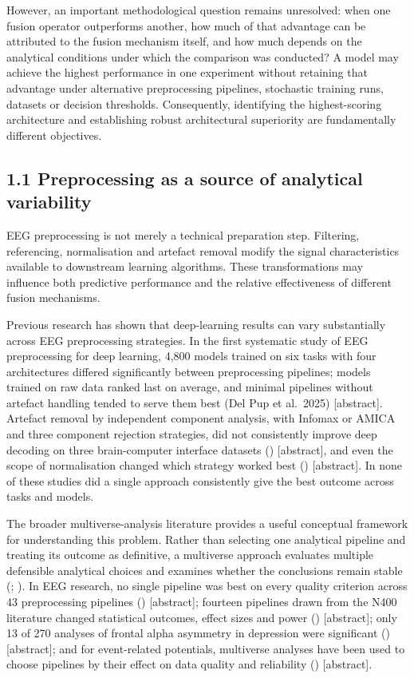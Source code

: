 \documentclass[11pt,a4paper]{article}
\newcounter{none} %
\begin{document}
However, an important methodological question remains unresolved: when one fusion
operator outperforms another, how much of that advantage can be attributed to the fusion
mechanism itself, and how much depends on the analytical conditions under which the
comparison was conducted? A model may achieve the highest performance in one experiment
without retaining that advantage under alternative preprocessing pipelines, stochastic
training runs, datasets or decision thresholds. Consequently, identifying the
highest-scoring architecture and establishing robust architectural superiority are
fundamentally different objectives.

\subsection{1.1 Preprocessing as a source of analytical variability}\label{preprocessing-as-a-source-of-analytical-variability}

EEG preprocessing is not merely a technical preparation step. Filtering, referencing,
normalisation and artefact removal modify the signal characteristics available to
downstream learning algorithms. These transformations may influence both predictive
performance and the relative effectiveness of different fusion mechanisms.

Previous research has shown that deep-learning results can vary substantially across
EEG preprocessing strategies. In the first systematic study of EEG preprocessing for deep
learning, 4,800 models trained on six tasks with four architectures differed
significantly between preprocessing pipelines; models trained on raw data ranked last on
average, and minimal pipelines without artefact handling tended to serve them best (Del
Pup et al.~2025) {[}abstract{]}. Artefact removal by independent component analysis, with
Infomax or AMICA and three component rejection strategies, did not consistently improve
deep decoding on three brain-computer interface datasets (\citealp{Kang_2024}) {[}abstract{]},
and even the scope of normalisation changed which strategy worked best (\citealp{Truong_2025}) {[}abstract{]}. In none of these studies did a single approach consistently
give the best outcome across tasks and models.

The broader multiverse-analysis literature provides a useful conceptual framework for
understanding this problem. Rather than selecting one analytical pipeline and treating
its outcome as definitive, a multiverse approach evaluates multiple defensible analytical
choices and examines whether the conclusions remain stable (\citealp{Steegen_2016}; \citealp{Clayson_2024}). In EEG research, no single pipeline was best on every quality criterion across 43
preprocessing pipelines (\citealp{Huang_2025}) {[}abstract{]}; fourteen pipelines drawn from the
N400 literature changed statistical outcomes, effect sizes and power (\citealp{Soskic_2024})
{[}abstract{]}; only 13 of 270 analyses of frontal alpha asymmetry in depression were
significant (\citealp{Kolodziej_2021}) {[}abstract{]}; and for event-related potentials,
multiverse analyses have been used to choose pipelines by their effect on data quality
and reliability (\citealp{Clayson_2021}) {[}abstract{]}.
\end{document}
